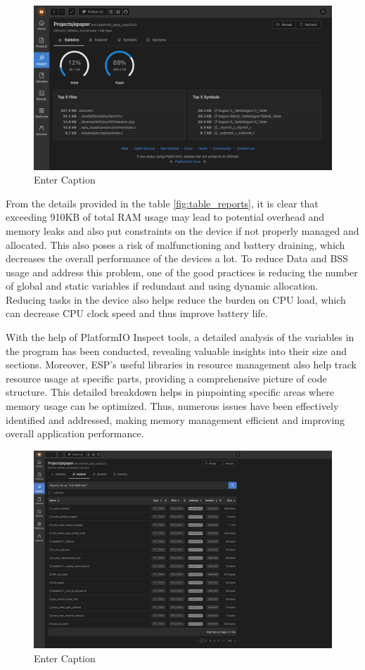 \documentclass[../Main.tex]{subfiles}
\begin{document}
\begin{figure}[H]
    \centering
    \includegraphics[width=0.8\linewidth]{doc//imgs/platformio-inspect.png}
    \caption{Enter Caption}
    \label{fig:enter-label}
\end{figure}

From the details provided in the table \ref{fig:table_reports}, it is clear that exceeding 910KB of total RAM usage may lead to potential overhead and memory leaks and also put constraints on the device if not properly managed and allocated. This also poses a risk of malfunctioning and battery draining, which decreases the overall performance of the devices a lot. To reduce Data and BSS usage and address this problem, one of the good practices is reducing the number of global and static variables if redundant and using dynamic allocation. Reducing tasks in the device also helps reduce the burden on CPU load, which can decrease CPU clock speed and thus improve battery life.

With the help of PlatformIO Inspect tools, a detailed analysis of the variables in the program has been conducted, revealing valuable insights into their size and sections. Moreover, ESP's useful libraries in resource management also help track resource usage at specific parts, providing a comprehensive picture of code structure. This detailed breakdown helps in pinpointing specific areas where memory usage can be optimized. Thus, numerous issues have been effectively identified and addressed, making memory management efficient and improving overall application performance.

\begin{figure}[H]
    \centering
    \includegraphics[width=0.95\linewidth]{doc//imgs/platformio-debug.png}
    \caption{Enter Caption}
    \label{fig:enter-label}
\end{figure}
\end{document}
